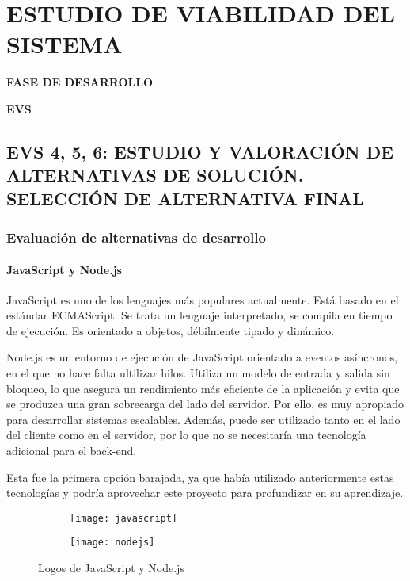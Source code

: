 \newpage
\chapter{ESTUDIO DE VIABILIDAD DEL SISTEMA}
	\vspace{2cm}	
	\begin{center}
	{\Large \textbf{FASE DE DESARROLLO} \par}
	\end{center}
	\vspace{5cm}
	
	\begin{center}
	\Huge \textbf{EVS}\par
	\end{center}\newpage
\section[EVS 4, 5, 6: ESTUDIO Y VALORACIÓN DE ALTERNATIVAS DE \\ SOLUCIÓN. SELECCIÓN DE ALTERNATIVA FINAL]{EVS 4, 5, 6: ESTUDIO Y VALORACIÓN DE ALTERNATIVAS DE SOLUCIÓN. SELECCIÓN DE ALTERNATIVA FINAL}

\subsection{Evaluación de alternativas de desarrollo} 
\subsubsection{JavaScript y Node.js}
JavaScript es uno de los lenguajes más populares actualmente. Está basado en el estándar ECMAScript. Se trata un lenguaje interpretado, se compila en tiempo de ejecución. Es orientado a objetos, débilmente tipado y dinámico\cite{JavaScript}. 
\par Node.js es un entorno de ejecución de JavaScript orientado a eventos asíncronos, en el que no hace falta ultilizar hilos. Utiliza un modelo de entrada y salida sin bloqueo, lo que asegura un rendimiento más eficiente de la aplicación y evita que se produzca una gran sobrecarga del lado del servidor. Por ello, es muy apropiado para desarrollar sistemas escalables\cite{NodeJS}. Además, puede ser utilizado tanto en el lado del cliente como en el servidor, por lo que no se necesitaría una tecnología adicional para el back-end.
\par Esta fue la primera opción barajada, ya que había utilizado anteriormente estas tecnologías y podría aprovechar este proyecto para profundizar en su aprendizaje.
\begin{figure}[H]
	\centering
	\begin{subfigure}{0.3\textwidth}
	\centering
	\texttt{[image: javascript]}
	\end{subfigure}
	\begin{subfigure}{0.3\textwidth}
	\centering
	\texttt{[image: nodejs]}
	\end{subfigure}
	\caption{Logos de JavaScript y Node.js}
\end{figure}

